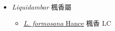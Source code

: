 
  \begin{itemize}
 \item[] \textit{Liquidambar} 楓香屬
                                
  \begin{itemize}
        \item[] \href{http://www.theplantlist.org/tpl1.1/search?q=Liquidambar+formosana}{\textit{L. formosana} Hance}   楓香   LC
  \end{itemize}
  \end{itemize}
